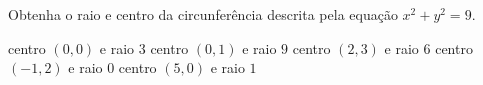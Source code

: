 Obtenha o raio e centro da circunferência descrita pela equação $x^2+y^2=9$.

centro $(0,0)$ e raio $3$
centro $(0,1)$ e raio $9$
centro $(2,3)$ e raio $6$
centro $(-1,2)$ e raio $0$
centro $(5,0)$ e raio $1$





